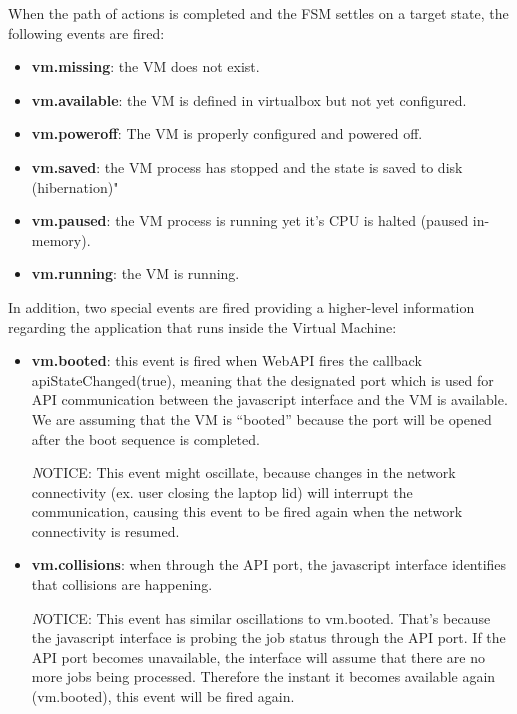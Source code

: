 \documentclass{article}
\begin{document}
When the path of actions is completed and the FSM settles on a target state, the following events are fired:

\begin{itemize}
    \item {\bf vm.missing}: the VM does not exist.
    \item {\bf vm.available}: the VM is defined in virtualbox but not yet configured.
    \item {\bf vm.poweroff}: The VM is properly configured and powered off.
    \item {\bf vm.saved}: the VM process has stopped and the state is saved to disk (hibernation)"
    \item {\bf vm.paused}: the VM process is running yet it’s CPU is halted (paused in-memory).
    \item {\bf vm.running}: the VM is running.
\end{itemize}

In addition, two special events are fired providing a higher-level information regarding the application that runs inside the Virtual Machine:

\begin{itemize}
\item {\bf vm.booted}: this event is fired when WebAPI fires the callback apiStateChanged(true), meaning that the designated port which is used for API communication between the javascript interface and the VM is available. We are assuming that the VM is “booted” because the port will be opened after the boot sequence is completed.

{\textit NOTICE: This event might oscillate, because changes in the network connectivity (ex. user closing the laptop lid) will interrupt the communication, causing this event to be fired again when the network connectivity is resumed.}

\item {\bf vm.collisions}: when through the API port, the javascript interface identifies that collisions are happening.

{\textit NOTICE: This event has similar oscillations to vm.booted. That’s because the javascript interface is probing the job status through the API port. If the API port becomes unavailable, the interface will assume that there are no more jobs being processed. Therefore the instant it becomes available again (vm.booted), this event will be fired again.}

\end{itemize}
\end{document}

